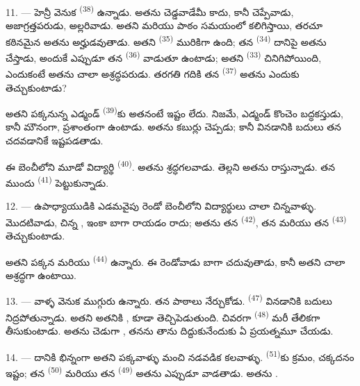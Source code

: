 \VUsaut{4.2mm}
\VUsaut{3.2mm}

11. --- హెన్రీ వెనుక  \textsuperscript{(38)} ఉన్నాడు. అతను చెడ్డవాడేమీ కాదు,
కానీ  చెప్పేవాడు, అజాగ్రత్తపరుడు, అల్లరివాడు. అతని  మరియు
 పాఠం సమయంలో  కలిగిస్తాయి, తరచూ కఠినమైన 
అతను అర్హుడవుతాడు. అతని  \textsuperscript{(35)} మురికిగా ఉంది; తన
 \textsuperscript{(34)} దానిపై అతను  చేస్తాడు, అందుకే ఎప్పుడూ
తన  \textsuperscript{(36)} వాడుతూ ఉంటాడు; అతని 
\textsuperscript{(33)} చినిగిపోయింది, ఎందుకంటే అతను చాలా అశ్రద్ధపరుడు. 
తరగతి గదికి తన  \textsuperscript{(37)} అతను ఎందుకు తెచ్చుకుంటాడు?

అతని పక్కనున్న ఎడ్మండ్ \textsuperscript{(39)}కు అతనంటే ఇష్టం లేదు. నిజమే, ఎడ్మండ్ కొంచెం
బద్ధకస్తుడు, కానీ మౌనంగా, ప్రశాంతంగా ఉంటాడు. అతను కబుర్లు చెప్పడు; కానీ వినడానికి బదులు తన
  చదవడానికే ఇష్టపడతాడు.

ఈ బెంచీలోని మూడో విద్యార్థి  \textsuperscript{(40)}. అతను శ్రద్ధగలవాడు. తెల్లని
 అతను రాస్తున్నాడు. తన ముందు  \textsuperscript{(41)}
పెట్టుకున్నాడు.

12. --- ఉపాధ్యాయుడికి ఎడమవైపు రెండో బెంచీలోని విద్యార్థులు చాలా చిన్నవాళ్ళు. మొదటివాడు, చిన్న
, ఇంకా బాగా రాయడం రాదు; అతను తన  \textsuperscript{(42)}, తన
 మరియు తన  \textsuperscript{(43)} తెచ్చుకుంటాడు.

అతని పక్కన  మరియు  \textsuperscript{(44)} ఉన్నారు. ఈ
రెండోవాడు బాగా చదువుతాడు, కానీ అతని  చాలా అశ్రద్ధగా ఉంటాయి.

13. --- వాళ్ళ వెనుక ముగ్గురు  ఉన్నారు.  తన పాఠాలు నేర్చుకోడు.
 \textsuperscript{(47)} వినడానికి బదులు నిద్రపోతున్నాడు. అతని 
అతనికి ,  కూడా తెచ్చిపెడుతుంది. చివరగా 
\textsuperscript{(48)} మరీ తేలికగా తీసుకుంటాడు. అతను చెడుగా , తనను తాను
దిద్దుకునేందుకు ఏ ప్రయత్నమూ చేయడు.

14. --- దానికి భిన్నంగా అతని పక్కవాళ్ళు మంచి నడవడిక కలవాళ్ళు. 
\textsuperscript{(51)}కు క్రమం, చక్కదనం ఇష్టం; తన  \textsuperscript{(50)}
మరియు తన  \textsuperscript{(49)} అతను ఎప్పుడూ వాడతాడు. అతను
.

